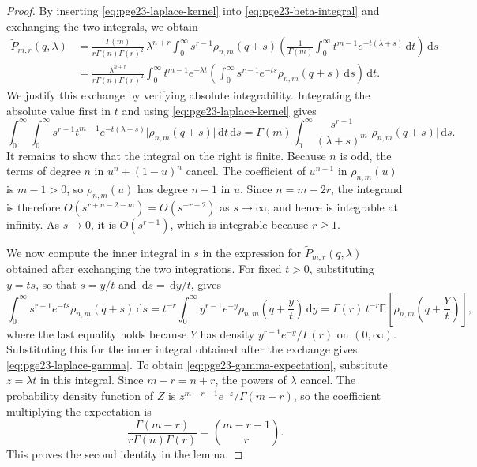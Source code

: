 \documentclass[11pt]{article}
\theoremstyle{remark}
\numberwithin{equation}{section}
\newcommand{\dd}{\,\mathrm d}
\newcommand{\E}{\mathbb E}
\begin{document}
\begin{proof}
  By inserting \eqref{eq:pge23-laplace-kernel} into
  \eqref{eq:pge23-beta-integral} and exchanging the two integrals, we obtain
  \begin{align*}
    \widetilde P_{m,r}(q,\lambda)
    &=\frac{\Gamma(m)}{r\Gamma(n)\Gamma(r)^2}\,\lambda^{n+r}
      \int_0^\infty s^{r-1}\rho_{n,m}(q+s)
      \left(\frac{1}{\Gamma(m)}\int_0^\infty t^{m-1}e^{-t(\lambda+s)}\dd t\right)
      \dd s\\
    &=\frac{\lambda^{n+r}}{r\Gamma(n)\Gamma(r)^2}
      \int_0^\infty t^{m-1}e^{-\lambda t}
      \left(\int_0^\infty s^{r-1}e^{-ts}\rho_{n,m}(q+s)\dd s\right)\dd t.
  \end{align*}
  We justify this exchange by verifying absolute integrability. Integrating
  the absolute value first in $t$ and using
  \eqref{eq:pge23-laplace-kernel} gives
  \[
    \int_0^\infty\!\!\int_0^\infty
    s^{r-1}t^{m-1}e^{-t(\lambda+s)}\bigl|\rho_{n,m}(q+s)\bigr|\dd t\dd s
    =\Gamma(m)\int_0^\infty \frac{s^{r-1}}{(\lambda+s)^m}
    \bigl|\rho_{n,m}(q+s)\bigr|\dd s.
  \]
  It remains to show that the integral on the right is finite.
  Because $n$ is odd, the terms of degree $n$ in $u^n+(1-u)^n$ cancel.
  The coefficient of $u^{n-1}$ in $\rho_{n,m}(u)$ is $m-1>0$, so
  $\rho_{n,m}(u)$ has degree $n-1$ in $u$.
  Since $n=m-2r$, the integrand is therefore
  $O(s^{r+n-2-m})=O(s^{-r-2})$ as $s\to\infty$, and hence is
  integrable at infinity. As $s\to0$,
  it is $O(s^{r-1})$, which is integrable because $r\ge1$.

  We now compute the inner integral in $s$ in the expression for
  $\widetilde P_{m,r}(q,\lambda)$ obtained after exchanging the two integrations.
  For fixed $t>0$, substituting $y=ts$, so that $s=y/t$ and
  $\dd s=\dd y/t$, gives
  \[
    \int_0^\infty s^{r-1}e^{-ts}\rho_{n,m}(q+s)\dd s
    =t^{-r}\int_0^\infty y^{r-1}e^{-y}
     \rho_{n,m}\left(q+\frac {y}{t}\right)\dd y
    =\Gamma(r)\,t^{-r}
     \E\left[\rho_{n,m}\left(q+\frac {Y}{t}\right)\right],
  \]
  where the last equality holds because $Y$ has density $y^{r-1}e^{-y}/\Gamma(r)$ on $(0,\infty)$.
  Substituting this for the inner integral obtained after the exchange gives \eqref{eq:pge23-laplace-gamma}.
  To obtain \eqref{eq:pge23-gamma-expectation}, substitute $z=\lambda t$
  in this integral. Since $m-r=n+r$, the powers of $\lambda$ cancel.
  The probability density function of $Z$ is
  $z^{m-r-1}e^{-z}/\Gamma(m-r)$, so the coefficient multiplying the
  expectation is
  \[
    \frac{\Gamma(m-r)}{r\Gamma(n)\Gamma(r)}
    =\binom{m-r-1}{r}.
  \]
  This proves the second identity in the lemma.
\end{proof}
\end{document}
